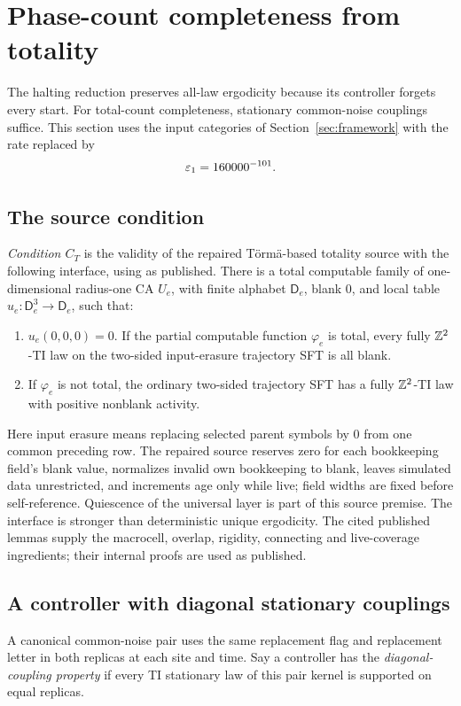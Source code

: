 \section{Phase-count completeness from totality}\label{sec:completeness}
The halting reduction preserves all-law ergodicity because its controller
forgets every start. For total-count completeness, stationary
common-noise couplings suffice. This section uses the input categories
of Section~\ref{sec:framework} with the rate replaced by
\begin{equation}\label{eq:totality-rate}
 \varepsilon_1=160000^{-101}.
\end{equation}

\subsection{The source condition}
\emph{Condition \(C_T\)} is the validity of the repaired
T\"orm\"a-based totality source with the following interface, using
\cite[Lemma~25, Corollary~26 and Lemmas~27--29]{torma} as published.
There is a total computable family of one-dimensional radius-one
CA \(U_e\), with finite alphabet \(\mathsf D_e\), blank \(0\), and
local table \(u_e:\mathsf D_e^3\to\mathsf D_e\), such that:
\begin{enumerate}
\item \(u_e(0,0,0)=0\). If the partial computable function
\(\varphi_e\) is total, every fully \(\mathbb Z^2\)-TI law on the
two-sided input-erasure trajectory SFT is all blank.
\item If \(\varphi_e\) is not total, the ordinary two-sided
trajectory SFT has a fully \(\mathbb Z^2\)-TI law with positive
nonblank activity.
\end{enumerate}
Here input erasure means replacing selected parent symbols by \(0\)
from one common preceding row. The repaired source reserves zero
for each bookkeeping field's blank value, normalizes invalid own
bookkeeping to blank, leaves simulated data unrestricted, and
increments age only while live; field widths are fixed before
self-reference. Quiescence of the universal layer is part of this
source premise. The interface is stronger than deterministic
unique ergodicity. The cited published lemmas supply the macrocell,
overlap, rigidity, connecting and live-coverage ingredients; their
internal proofs are used as published.

\subsection{A controller with diagonal stationary couplings}
A canonical common-noise pair uses the same replacement flag and
replacement letter in both replicas at each site and time. Say a
controller has the \emph{diagonal-coupling property} if every TI
stationary law of this pair kernel is supported on equal replicas.


